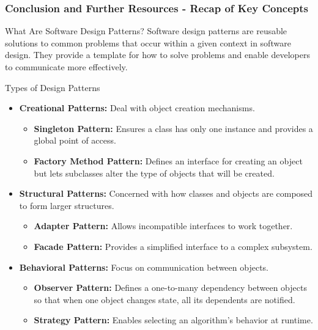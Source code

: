 \documentclass{beamer}
\begin{document}
\begin{frame}[fragile]
    \frametitle{Conclusion and Further Resources - Recap of Key Concepts}

    \begin{block}{What Are Software Design Patterns?}
        Software design patterns are reusable solutions to common problems that occur within a given context in software design. 
        They provide a template for how to solve problems and enable developers to communicate more effectively.
    \end{block}

    \begin{block}{Types of Design Patterns}
        \begin{itemize}
            \item \textbf{Creational Patterns:} Deal with object creation mechanisms.
            \begin{itemize}
                \item \textbf{Singleton Pattern:} Ensures a class has only one instance and provides a global point of access.
                \item \textbf{Factory Method Pattern:} Defines an interface for creating an object but lets subclasses alter the type of objects that will be created.
            \end{itemize}

            \item \textbf{Structural Patterns:} Concerned with how classes and objects are composed to form larger structures.
            \begin{itemize}
                \item \textbf{Adapter Pattern:} Allows incompatible interfaces to work together.
                \item \textbf{Facade Pattern:} Provides a simplified interface to a complex subsystem.
            \end{itemize}

            \item \textbf{Behavioral Patterns:} Focus on communication between objects.
            \begin{itemize}
                \item \textbf{Observer Pattern:} Defines a one-to-many dependency between objects so that when one object changes state, all its dependents are notified.
                \item \textbf{Strategy Pattern:} Enables selecting an algorithm's behavior at runtime.
            \end{itemize}
        \end{itemize}
    \end{block}
\end{frame}
\end{document}
